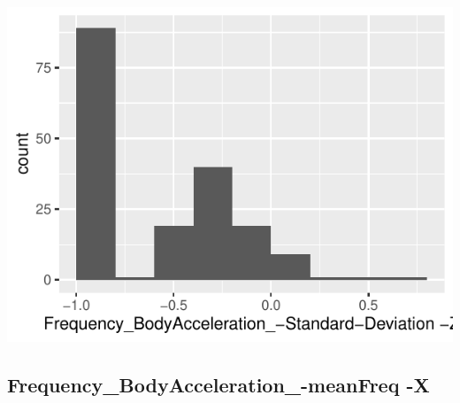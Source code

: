 \documentclass[
]{article}
\begin{document}
\begin{minipage}{0.25 \textwidth}

\includegraphics{codebook_tidydatasub_files/figure-latex/Var-48-Frequency-BodyAcceleration--Standard-Deviation--Z-1.pdf}

\end{minipage}

\noindent\makebox[\linewidth]{\rule{\textwidth}{0.4pt}}

\hypertarget{frequency_bodyacceleration_-meanfreq--x}{%
\subsection{Frequency\_BodyAcceleration\_-meanFreq
-X}\label{frequency_bodyacceleration_-meanfreq--x}}
\end{document}
